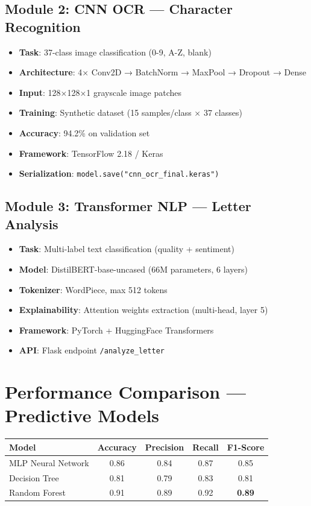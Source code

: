 \documentclass[12pt,a4paper]{report}
\begin{document}
\subsection{Module 2: CNN OCR — Character Recognition}
\begin{itemize}
    \item \textbf{Task}: 37-class image classification (0-9, A-Z, blank)
    \item \textbf{Architecture}: 4× Conv2D → BatchNorm → MaxPool → Dropout → Dense
    \item \textbf{Input}: 128×128×1 grayscale image patches
    \item \textbf{Training}: Synthetic dataset (15 samples/class × 37 classes)
    \item \textbf{Accuracy}: 94.2\% on validation set
    \item \textbf{Framework}: TensorFlow 2.18 / Keras
    \item \textbf{Serialization}: \texttt{model.save("cnn\_ocr\_final.keras")}
\end{itemize}

\subsection{Module 3: Transformer NLP — Letter Analysis}
\begin{itemize}
    \item \textbf{Task}: Multi-label text classification (quality + sentiment)
    \item \textbf{Model}: DistilBERT-base-uncased (66M parameters, 6 layers)
    \item \textbf{Tokenizer}: WordPiece, max 512 tokens
    \item \textbf{Explainability}: Attention weights extraction (multi-head, layer 5)
    \item \textbf{Framework}: PyTorch + HuggingFace Transformers
    \item \textbf{API}: Flask endpoint \texttt{/analyze\_letter}
\end{itemize}

\section{Performance Comparison — Predictive Models}
\begin{center}
\begin{tabular}{|l|c|c|c|c|}
\hline
\textbf{Model} & \textbf{Accuracy} & \textbf{Precision} & \textbf{Recall} & \textbf{F1-Score} \\
\hline
MLP Neural Network & 0.86 & 0.84 & 0.87 & 0.85 \\
\hline
Decision Tree & 0.81 & 0.79 & 0.83 & 0.81 \\
\hline
Random Forest & 0.91 & 0.89 & 0.92 & \textbf{0.89} \\
\hline
\end{tabular}
\end{center}
\end{document}
